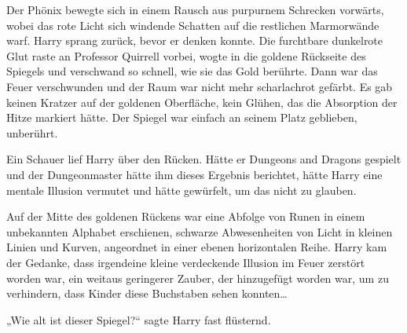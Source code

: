 Der Phönix bewegte sich in einem Rausch aus purpurnem Schrecken vorwärts, wobei das rote Licht sich windende Schatten auf die restlichen Marmorwände warf. Harry sprang zurück, bevor er denken konnte.
Die furchtbare dunkelrote Glut raste an Professor Quirrell vorbei, wogte in die goldene Rückseite des Spiegels und verschwand so schnell, wie sie das Gold berührte.
Dann war das Feuer verschwunden und der Raum war nicht mehr scharlachrot gefärbt.
Es gab keinen Kratzer auf der goldenen Oberfläche, kein Glühen, das die Absorption der Hitze markiert hätte. Der Spiegel war einfach an seinem Platz geblieben, unberührt.

Ein Schauer lief Harry über den Rücken. Hätte er Dungeons and Dragons gespielt und der Dungeonmaster hätte ihm dieses Ergebnis berichtet, hätte Harry eine mentale Illusion vermutet und hätte gewürfelt, um das nicht zu glauben.

Auf der Mitte des goldenen Rückens war eine Abfolge von Runen in einem unbekannten Alphabet erschienen, schwarze Abwesenheiten von Licht in kleinen Linien und Kurven, angeordnet in einer ebenen horizontalen Reihe. Harry kam der Gedanke, dass irgendeine kleine verdeckende Illusion im Feuer zerstört worden war, ein weitaus geringerer Zauber, der hinzugefügt worden war, um zu verhindern, dass Kinder diese Buchstaben sehen konnten…

„Wie alt ist dieser Spiegel?“ sagte Harry fast flüsternd.

